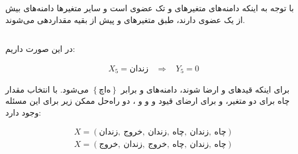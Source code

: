\documentclass{article}
\begin{document}
\subsection{}%
\subsection{}%
با توجه به اینکه دامنه‌های متغیرهای  و  تک عضوی است و سایر متغیرها دامنه‌های بیش از یک عضوی دارند، طبق  متغیرهای  و  پیش از بقیه مقداردهی می‌شوند.
\subsection{}%
در این صورت داریم: \\
\begin{fleqn}
\begin{equation}
\begin{aligned}
X_{5} = \text{زندان} \:\:\:\: \Rightarrow \:\:\:\:
Y_{5} = 0
\end{aligned}
\end{equation}
\end{fleqn}
برای اینکه قیدهای  و  ارضا شوند، دامنه‌های  و  برابر $\left\{ چاه \right\}$ می‌شود. با انتخاب مقدار چاه برای دو متغیر، و برای ارضای قیود  و  و  و ، دو راه‌حل ممکن زیر برای این مسئله وجود دارد: \\
\begin{fleqn}
\begin{equation}
\begin{aligned}
X = \left( \text{زندان}, \: \text{خروج}, \: \text{زندان}, \: \text{چاه}, \: \text{زندان}, \: \text{چاه} \right) \\
X = \left( \text{خروج}, \: \text{زندان}, \: \text{خروج}, \: \text{چاه}, \: \text{زندان}, \: \text{چاه} \right) \\
\end{aligned}
\end{equation}
\end{fleqn}

\subsection{}%
\subsection{}%
\end{document}
